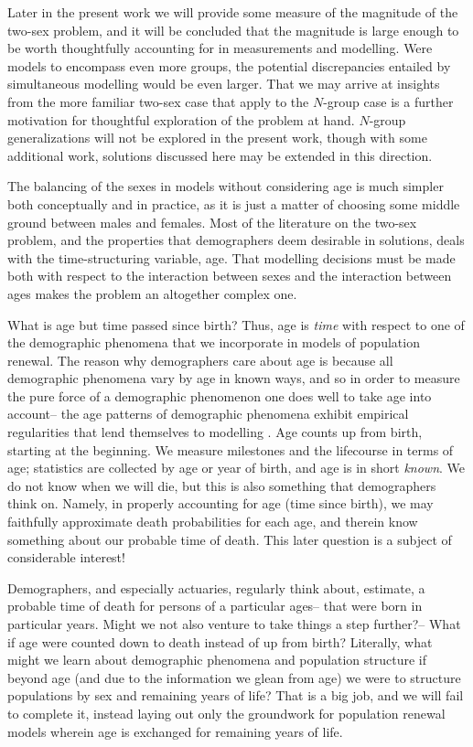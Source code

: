 Later in the
present work we will provide some measure of the magnitude of the two-sex problem, 
and it will be concluded that the
magnitude is large enough to be worth thoughtfully accounting for in
measurements and modelling. Were models to encompass even more groups, the potential
discrepancies entailed by simultaneous modelling would be even larger. That we may arrive at
insights from the more familiar two-sex case that apply to the $N$-group case is
a further motivation for thoughtful exploration of the problem at hand.
$N$-group generalizations will not be explored in the present work, though with
some additional work, solutions discussed here may be extended in this
direction.

The balancing of the sexes in models without considering age is
much simpler both conceptually and in practice, as it is just a matter of
choosing some middle ground between males and females. Most of the literature on
the two-sex problem, and the properties that demographers deem desirable in
solutions, deals with the time-structuring variable, age. That modelling
decisions must be made both with respect to the interaction between sexes and
the interaction between ages makes the problem an altogether complex one. 

What is age but time passed since birth? Thus, age is \textit{time} with respect
to one of the demographic phenomena that we incorporate in models of population
renewal. The reason why demographers care about age is because all
demographic phenomena vary by age in known ways, and so in order to measure the
pure force of a demographic phenomenon one does well to take age into account-- the age patterns of
demographic phenomena exhibit empirical regularities that lend themselves to
modelling \citep{coale1996development}. Age counts 
up from birth, starting at the beginning. We measure milestones and the lifecourse in 
terms of age; statistics are collected by age or year of birth, and age is in 
short \textit{known}. We do not know when we will die, but
this is also something that demographers think on. Namely, in properly
accounting for age (time since birth), we may faithfully approximate death
probabilities for each age, and therein know something about our probable time
of death. This later question is a subject of considerable interest!

Demographers, and especially actuaries, regularly think about, estimate, a
probable time of death for persons of a particular ages-- that were born in
particular years. Might we not also venture to take things a step further?--
What if age were counted down to death instead of up
from birth? Literally, what might we learn about demographic phenomena and
population structure if beyond age (and due to the information we glean from
age) we were to structure populations by sex and remaining years of life? That
is a big job, and we will fail to complete it, instead laying out only the groundwork
for population renewal models wherein age is exchanged for remaining years of
life.

